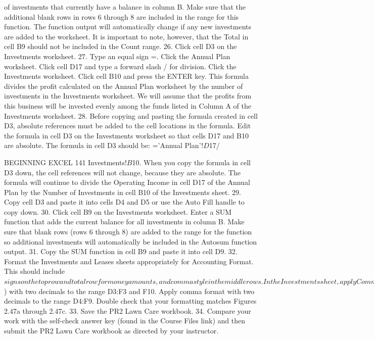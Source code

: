 of investments that currently have a balance in column B. Make sure that the additional blank
rows in rows 6 through 8 are included in the range for this function. The function output will
automatically change if any new investments are added to the worksheet. It is important to note,
however, that the Total in cell B9 should not be included in the Count range.
26. Click cell D3 on the Investments worksheet.
27. Type an equal sign =. Click the Annual Plan worksheet. Click cell D17 and type a forward slash
/ for division. Click the Investments worksheet. Click cell B10 and press the ENTER key. This
formula divides the profit calculated on the Annual Plan worksheet by the number of
investments in the Investments worksheet. We will assume that the profits from this business
will be invested evenly among the funds listed in Column A of the Investments worksheet.
28. Before copying and pasting the formula created in cell D3, absolute references must be added to
the cell locations in the formula. Edit the formula in cell D3 on the Investments worksheet so
that cells D17 and B10 are absolute. The formula in cell D3 should be: ='Annual Plan'!$D$17/

BEGINNING EXCEL 141
Investments!$B$10. When you copy the formula in cell D3 down, the cell references will not
change, because they are absolute. The formula will continue to divide the Operating Income in
cell D17 of the Annual Plan by the Number of Investments in cell B10 of the Investments sheet.
29.   Copy cell D3 and paste it into cells D4 and D5 or use the Auto Fill handle to copy down.
30.   Click cell B9 on the Investments worksheet. Enter a SUM function that adds the current balance
for all investments in column B. Make sure that blank rows (rows 6 through 8) are added to the
range for the function so additional investments will automatically be included in the Autosum
function output.
31.   Copy the SUM function in cell B9 and paste it into cell D9.
32.   Format the Investments and Leases sheets appropriately for Accounting Format. This should
include $ signs on the top row and total row for money amounts, and comma style in the middle
rows. In the Investments sheet, apply Comma Style with 0 decimals to the ranges B4:B5 and
D4:D5. In the Leases worksheet, apply Accounting Number Format ($) with two decimals to the
range D3:F3 and F10. Apply comma format with two decimals to the range D4:F9. Double check
that your formatting matches Figures 2.47a through 2.47c.
33.   Save the PR2 Lawn Care workbook.
34.   Compare your work with the self-check answer key (found in the Course Files link) and then
submit the PR2 Lawn Care workbook as directed by your instructor.




